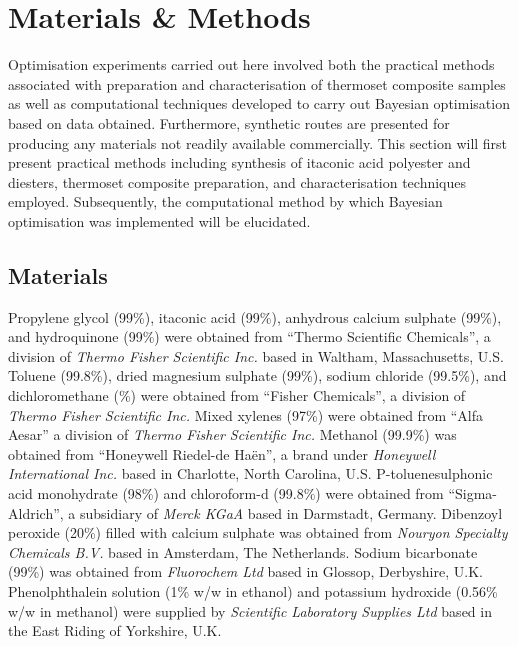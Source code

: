 \section{Materials \& Methods}
Optimisation experiments carried out here involved both the practical 
 methods associated with preparation and characterisation of thermoset 
 composite samples as well as computational techniques developed to carry
 out Bayesian optimisation based on data obtained.
Furthermore, synthetic routes are presented for producing any materials
 not readily available commercially.
This section will first present practical methods including
 synthesis of itaconic acid polyester and diesters, thermoset composite
 preparation, and characterisation techniques employed.
Subsequently, the computational method by which Bayesian optimisation was
 implemented will be elucidated.

\subsection{Materials}
Propylene glycol (99\unit{\percent}), itaconic acid
 (99\unit{\percent}), anhydrous calcium sulphate (99\unit{\percent}), and
  hydroquinone (99\unit{\percent}) were obtained from ``Thermo Scientific 
  Chemicals'', a division of \textit{Thermo Fisher Scientific Inc.} based 
  in Waltham, Massachusetts, U.S.
Toluene (99.8\unit{\percent}), dried magnesium sulphate 
 (99\unit{\percent}), sodium chloride (99.5\unit{\percent}), and 
 dichloromethane (\unit{\percent}) were obtained from ``Fisher Chemicals'',
 a division of \textit{Thermo Fisher Scientific Inc.}
Mixed xylenes (97\unit{\percent}) were obtained from ``Alfa Aesar'' a 
 division of \textit{Thermo Fisher Scientific Inc.}
Methanol (99.9\unit{\percent}) was obtained from ``Honeywell Riedel-de 
 Ha\"{e}n'', a brand under \textit{Honeywell International Inc.} based in
 Charlotte, North Carolina, U.S.
P-toluenesulphonic acid monohydrate (98\unit{\percent}) and 
 chloroform-d (99.8\unit{\percent}) were obtained from ``Sigma-Aldrich'', a
 subsidiary of \textit{Merck KGaA} based in Darmstadt, Germany.
Dibenzoyl peroxide (20\unit{\percent}) filled with calcium sulphate was 
 obtained from \textit{Nouryon Specialty Chemicals B.V.} based in Amsterdam,
 The Netherlands.
Sodium bicarbonate (99\unit{\percent}) was obtained from 
 \textit{Fluorochem Ltd} based in Glossop, Derbyshire, U.K.
 Phenolphthalein solution (1\unit{\percent} w/w in ethanol) and potassium
 hydroxide (0.56\unit{\percent} w/w in methanol) were supplied 
 by \textit{Scientific Laboratory Supplies Ltd} based in the East Riding 
 of Yorkshire, U.K.


